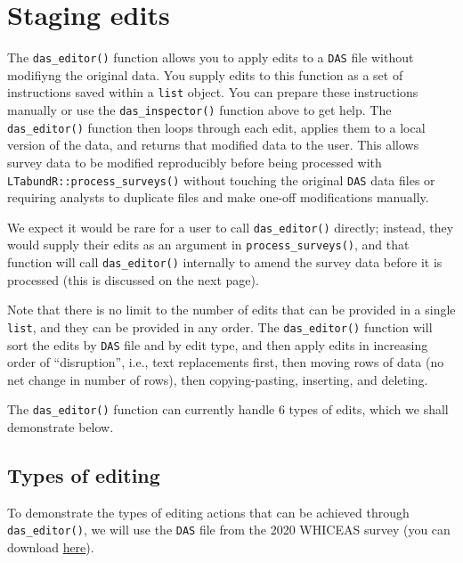\documentclass[
]{book}
\begin{document}
\hypertarget{staging-edits}{%
\section*{Staging edits}\label{staging-edits}}

The \texttt{das\_editor()} function allows you to apply edits to a \texttt{DAS} file without modifiyng the original data. You supply edits to this function as a set of instructions saved within a \texttt{list} object. You can prepare these instructions manually or use the \texttt{das\_inspector()} function above to get help. The \texttt{das\_editor()} function then loops through each edit, applies them to a local version of the data, and returns that modified data to the user. This allows survey data to be modified reproducibly before being processed with \texttt{LTabundR::process\_surveys()} without touching the original \texttt{DAS} data files or requiring analysts to duplicate files and make one-off modifications manually.

We expect it would be rare for a user to call \texttt{das\_editor()} directly; instead, they would supply their edits as an argument in \texttt{process\_surveys()}, and that function will call \texttt{das\_editor()} internally to amend the survey data before it is processed (this is discussed on the next page).

Note that there is no limit to the number of edits that can be provided in a single \texttt{list}, and they can be provided in any order. The \texttt{das\_editor()} function will sort the edits by \texttt{DAS} file and by edit type, and then apply edits in increasing order of ``disruption'', i.e., text replacements first, then moving rows of data (no net change in number of rows), then copying-pasting, inserting, and deleting.

The \texttt{das\_editor()} function can currently handle 6 types of edits, which we shall demonstrate below.

\hypertarget{types-of-editing}{%
\subsection*{Types of editing}\label{types-of-editing}}

To demonstrate the types of editing actions that can be achieved through \texttt{das\_editor()}, we will use the \texttt{DAS} file from the 2020 WHICEAS survey (you can download \href{https://raw.githubusercontent.com/emk-noaa/LTAvignette/main/data/surveys/HICEASwinter2020.das?token=GHSAT0AAAAAACFPESQVZWKAJE3NCRQBC4SCZGRJNLA}{here}).
\end{document}
